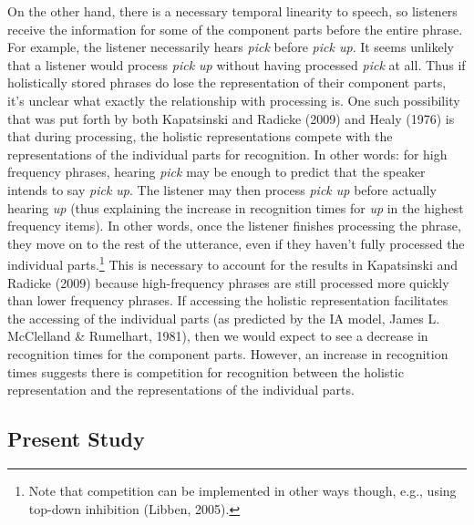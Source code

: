 \documentclass[
  man,floatsintext]{apa6}
\begin{document}
On the other hand, there is a necessary temporal linearity to speech, so listeners receive the information for some of the component parts before the entire phrase. For example, the listener necessarily hears \emph{pick} before \emph{pick up}. It seems unlikely that a listener would process \emph{pick up} without having processed \emph{pick} at all. Thus if holistically stored phrases do lose the representation of their component parts, it's unclear what exactly the relationship with processing is. One such possibility that was put forth by both Kapatsinski and Radicke (2009) and Healy (1976) is that during processing, the holistic representations compete with the representations of the individual parts for recognition. In other words: for high frequency phrases, hearing \emph{pick} may be enough to predict that the speaker intends to say \emph{pick up}. The listener may then process \emph{pick up} before actually hearing \emph{up} (thus explaining the increase in recognition times for \emph{up} in the highest frequency items). In other words, once the listener finishes processing the phrase, they move on to the rest of the utterance, even if they haven't fully processed the individual parts.\footnote{Note that competition can be implemented in other ways though, e.g., using top-down inhibition (Libben, 2005).} This is necessary to account for the results in Kapatsinski and Radicke (2009) because high-frequency phrases are still processed more quickly than lower frequency phrases. If accessing the holistic representation facilitates the accessing of the individual parts (as predicted by the IA model, James L. McClelland \& Rumelhart, 1981), then we would expect to see a decrease in recognition times for the component parts. However, an increase in recognition times suggests there is competition for recognition between the holistic representation and the representations of the individual parts.

\hypertarget{present-study}{%
\subsection{Present Study}\label{present-study}}
\end{document}
